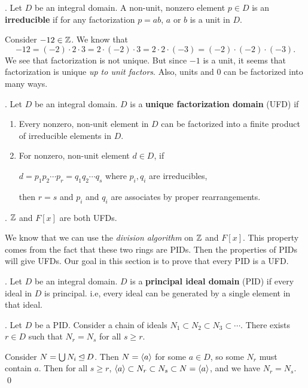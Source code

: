 \pagebreak

.  Let \(D\) be an integral domain. A non-unit, nonzero element \(p \in D\) is an \textbf{irreducible} if for any factorization \(p = ab\), \(a\) or \(b\) is a unit in \(D\).

Consider \(-12 \in \mathbb{Z}\). We know that
\[
    -12 = (-2)\cdot 2 \cdot 3 = 2 \cdot (-2) \cdot 3 = 2 \cdot 2 \cdot (-3) = (-2) \cdot (-2) \cdot (-3).
\]
We see that factorization is not unique. But since \(-1\) is a unit, it seems that factorization is unique \textit{up to unit factors}. Also, units and \(0\) can be factorized into many ways.

.  Let \(D\) be an integral domain. \(D\) is a \textbf{unique factorization domain} (UFD) if
\begin{enumerate}
    \item Every nonzero, non-unit element in \(D\) can be factorized into a finite product of irreducible elements in \(D\).
    \item For nonzero, non-unit element \(d \in D\), if
    \begin{center}
        \(d = p_1p_2 \cdots p_r = q_1q_2 \cdots q_s\) where \(p_i, q_i\) are irreducibles,
    \end{center}
    then \(r = s\) and \(p_i\) and \(q_i\) are associates by proper rearrangements.
\end{enumerate}

\ex. \(\mathbb{Z}\) and \(F[x]\) are both UFDs.

We know that we can use the \textit{division algorithm} on \(\mathbb{Z}\) and \(F[x]\). This property comes from the fact that these two rings are PIDs. Then the properties of PIDs will give UFDs. Our goal in this section is to prove that every PID is a UFD.

.  Let \(D\) be an integral domain. \(D\) is a \textbf{principal ideal domain} (PID) if every ideal in \(D\) is principal. i.e, every ideal can be generated by a single element in that ideal.

\lemma.  Let \(D\) be a PID. Consider a chain of ideals \(N_1 \subset N_2 \subset N_3 \subset \cdots\).
There exists \(r \in D\) such that \(N_r = N_s\) for all \(s \geq r\).

\pf Consider \(N = \bigcup N_i \unlhd D\). Then \(N = \left\langle a \right\rangle\) for some \(a \in D\), so some \(N_r\) must contain \(a\). Then for all \(s \geq r\), \(\left\langle a \right\rangle \subset N_r \subset N_s \subset N = \left\langle a \right\rangle\), and we have \(N_r = N_s\). \qed

